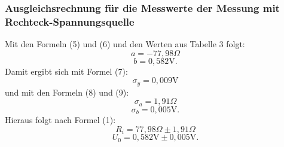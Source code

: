 \subsubsection{Ausgleichsrechnung für die Messwerte der Messung mit Rechteck-Spannungsquelle}
Mit den Formeln (5) und (6) und den Werten aus Tabelle 3 folgt:
\begin{displaymath}
a=-77,98\Omega
\end{displaymath}
\begin{displaymath}
b=0,582\text{V.}
\end{displaymath}
Damit ergibt sich mit Formel (7):
\begin{displaymath}
\sigma_y=0,009\text{V}
\end{displaymath}
und mit den Formeln (8) und (9):
\begin{displaymath}
\sigma_a=1,91\Omega
\end{displaymath}
\begin{displaymath}
\sigma_b=0,005\text{V.}
\end{displaymath}
Hieraus folgt nach Formel (1):
\begin{displaymath}
R_i=77,98\Omega\pm 1,91\Omega
\end{displaymath}
\begin{displaymath}
U_0=0,582\text{V}\pm 0,005\text{V.}
\end{displaymath}

